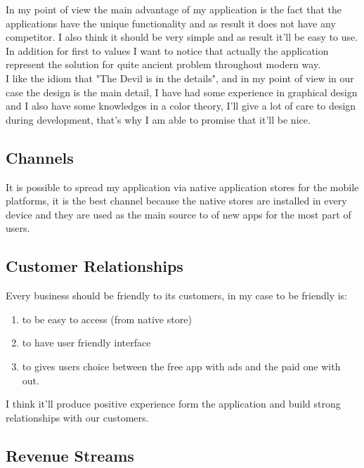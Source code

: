 \documentclass[english]{article}
\begin{document}
In my point of view the main advantage of my application is the fact that the applications have the unique functionality and as result it does not have any competitor. I also think it should be very simple and as result it'll be easy to use. In addition for first to values I want to notice that actually the application represent the solution for quite ancient problem throughout modern way.\\

I like the idiom that "The Devil is in the details", and in my point of view in our case the design is the main detail, I have had some experience in graphical design and I also have some knowledges in a color theory, I'll give a lot of care to design during development, that's why I am able to promise that it'll be nice.

\subsection{Channels}

It is possible to spread my application via native application stores for the mobile platforms, it is the best channel because the native stores are installed in every device and they are used as the main source to of new apps for the most part of users.
\subsection{Customer Relationships}

Every business should be friendly to its customers, in my case to be friendly is:
\begin{enumerate}

  \item to be easy to access (from native store)
  \item to have user friendly interface
  \item to gives users choice between the free app with ads and the paid one with out.

\end{enumerate}

I think it'll produce positive experience form the application and build strong relationships with our customers. 


\subsection{Revenue Streams}
\end{document}
